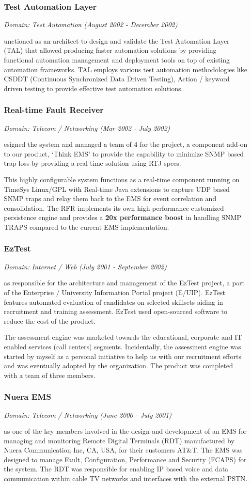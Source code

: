 \documentclass[a4paper,11pt]{article}
\newcommand\cvprojectentry[5]{
  \subsubsection*{#1}
  
  \vspace{-7pt}
  
  \it{Domain: #2}\normalfont{} \quad (#3 - #4)
  
}
\begin{document}
\begin{multicols}{2}
\cvprojectentry{Test Automation Layer}{Test Automation}{August 2002}{December 2002}

Functioned as an architect to design and validate the Test Automation
Layer (TAL) that allowed producing faster automation solutions by
providing functional automation management and deployment tools on top
of existing automation frameworks. TAL employs various test automation
methodologies like CSDDT (Continuous Synchronized Data Driven
Testing), Action / keyword driven testing to provide effective test
automation solutions.
 
\cvprojectentry{Real-time Fault Receiver}{Telecom / Networking}{Mar 2002}{July 2002}

Designed the system and managed a team of 4 for the project, a
component add-on to our product, `Think EMS' to provide the capability
to minimize SNMP based trap loss by providing a real-time solution
using RTJ specs.
 
This highly configurable system functions as a real-time component
running on TimeSys Linux/GPL with Real-time Java extensions to capture
UDP based SNMP traps and relay them back to the EMS for event
correlation and consolidation. The RFR implements its own high
performance customized persistence engine and provides a \textbf{20x
performance boost} in handling SNMP TRAPS compared to the current EMS
implementation.
 
\cvprojectentry{EzTest}{Internet / Web}{July 2001}{September 2002}
 
Was responsible for the architecture and management of the EzTest
project, a part of the Enterprise / University Information Portal
project (E/UIP). EzTest features automated evaluation of candidates on
selected skillsets aiding in recruitment and training
assessment. EzTest used open-sourced software to reduce the cost of
the product.
 
The assessment engine was marketed towards the educational, corporate
and IT enabled services (call centers) segments. Incidentally, the
assessment engine was started by myself as a personal initiative to
help us with our recruitment efforts and was eventually adopted by the
organization. The product was completed with a team of three members.
 
\cvprojectentry{Nuera EMS}{Telecom / Networking}{June 2000}{July 2001}

Was one of the key members involved in the design and development of
an EMS for managing and monitoring Remote Digital Terminals (RDT)
manufactured by Nuera Communication Inc, CA, USA, for their customers
AT\&T. The EMS was designed to manage Fault, Configuration, Performance
and Security (FCAPS) for the system. The RDT was responsible for
enabling IP based voice and data communication within cable TV
networks and interfaces with the external PSTN.
 

\end{multicols}
\end{document}

